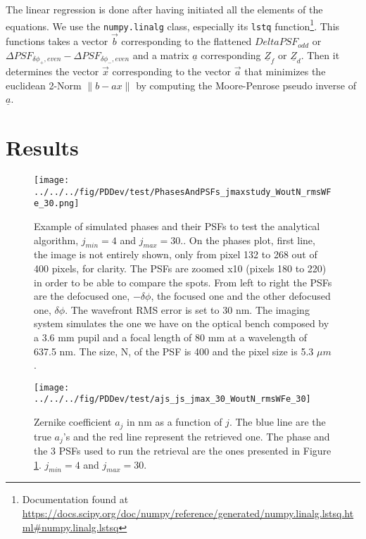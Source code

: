 The linear regression is done after having initiated all the elements of the equations. We use the \verb!numpy.linalg! class, especially its \verb!lstq! function\footnote{Documentation found at \url{https://docs.scipy.org/doc/numpy/reference/generated/numpy.linalg.lstsq.html\#numpy.linalg.lstsq}}. This functions takes a vector $\vec{b}$ corresponding to the flattened $Delta PSF_{odd}$ or $\Delta PSF_{\delta\phi_+, even}-\Delta PSF_{\delta\phi_-, even}$ and a matrix  $\underline{a}$ corresponding $\underline{Z}_f$ or $\underline{Z}_d$. Then it determines the vector $\vec{x}$ corresponding to the vector $\vec{a}$ that minimizes the euclidean 2-Norm $\lVert b-ax \rVert$ by computing the Moore-Penrose pseudo inverse of $\underline{a}$.

\section{Results}
\label{sec:ourPDresult}

\begin{figure}
\begin{center}
\texttt{[image: ../../../fig/PDDev/test/PhasesAndPSFs\_jmaxstudy\_WoutN\_rmsWFe\_30.png]}
\decoRule
\caption{Example of simulated phases and their PSFs to test the analytical algorithm, $j_{min}=4$ and $j_{max}=30$.. On the phases plot, first line, the image is not entirely shown, only from pixel 132 to 268 out of 400 pixels, for clarity. The PSFs are zoomed x10 (pixels 180 to 220) in order to be able to compare the spots. From left to right the PSFs are the defocused one, $-\delta\phi$, the focused one and the other defocused one, $\delta\phi$. The wavefront RMS error is set to 30 nm. The imaging system simulates the one we have on the optical bench composed by a 3.6 mm pupil and a focal length of 80 mm at a wavelength of 637.5 nm. The size, N, of the PSF is 400 and the pixel size is 5.3 $\mu m$.}
\label{fig:simPhasesAndPSFs}
\end{center}
\end{figure}
 

\begin{figure}
\begin{center}
\texttt{[image: ../../../fig/PDDev/test/ajs\_js\_jmax\_30\_WoutN\_rmsWFe\_30]}
\decoRule
\caption{Zernike coefficient $a_j$ in nm as a function of $j$. The blue line are the true $a_j$'s and the red line represent the retrieved one. The phase and the 3 PSFs used to run the retrieval are the ones presented in Figure \ref{fig:simPhasesAndPSFs}. $j_{min}=4$ and $j_{max}=30$.}
\label{fig:ajs_js_jmax_30_WoutN_rmsWFe_30}
\end{center}
\end{figure} 

